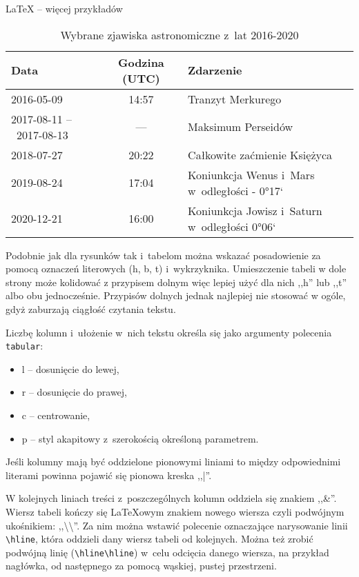 \begin{easyappendix}{\LaTeX{} -- więcej przykładów}
\begin{table}[!ht]
	\caption{\label{tab:zjawiska}Wybrane zjawiska astronomiczne z~lat 2016-2020}
	\centering
	\begin{tabular}{p{2.5cm}c|l}
		Data        &   Godzina (UTC)   &   Zdarzenie\\\hline\hline
		2016-05-09  &   14:57           &   Tranzyt Merkurego\\\hline
		2017-08-11 --~2017-08-13  & --- &   Maksimum Perseidów \\\hline
		2018-07-27  &   20:22           &   Całkowite zaćmienie Księżyca\\\hline
		2019-08-24  &   17:04           &   Koniunkcja Wenus i~Mars w~odległości - 0°17`\\\hline
		2020-12-21  &   16:00           &   Koniunkcja Jowisz i~Saturn w~odległości 0°06`
	\end{tabular}
\end{table}

Podobnie jak dla rysunków tak i~tabelom można wskazać posadowienie za pomocą oznaczeń literowych (h, b, t) i~wykrzyknika. Umieszczenie tabeli w dole strony może kolidować z przypisem dolnym więc lepiej użyć dla nich ,,h'' lub ,,t'' albo obu jednocześnie. Przypisów dolnych jednak najlepiej nie stosować w ogóle, gdyż zaburzają ciągłość czytania tekstu.

 Liczbę kolumn i~ułożenie w~nich tekstu określa się jako argumenty polecenia \texttt{tabular}:
\begin{itemize}
	\item l -- dosunięcie do lewej,
	\item r -- dosunięcie do prawej,
	\item c -- centrowanie,
	\item p -- styl akapitowy z~szerokością określoną parametrem.
\end{itemize}
Jeśli kolumny mają być oddzielone pionowymi liniami to między odpowiednimi literami powinna pojawić się pionowa kreska ,,|''.

W kolejnych liniach treści z~poszczególnych kolumn oddziela się znakiem ,,\&''. Wiersz tabeli kończy się {\LaTeX}owym znakiem nowego wiersza czyli podwójnym ukośnikiem: ,,\textbackslash\textbackslash''. Za nim można wstawić polecenie oznaczające narysowanie linii \texttt{\textbackslash{}hline}, która oddzieli dany wiersz tabeli od kolejnych. Można też zrobić podwójną linię (\texttt{\textbackslash{}hline\textbackslash{}hline}) w~celu odcięcia danego wiersza, na przykład nagłówka, od następnego za pomocą wąskiej, pustej przestrzeni.


\end{easyappendix}
